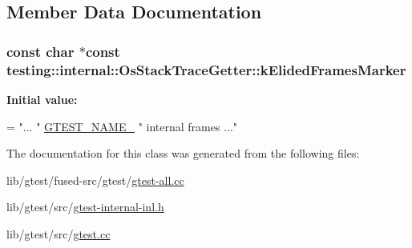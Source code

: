 \subsection{Member Data Documentation}
\hypertarget{classtesting_1_1internal_1_1_os_stack_trace_getter_aa736c26a4ba2b59a7572e7f44bfe269e}{
\subsubsection[{k\-Elided\-Frames\-Marker}]{\setlength{\rightskip}{0pt plus 5cm}const char $\ast$const testing\-::internal\-::\-Os\-Stack\-Trace\-Getter\-::k\-Elided\-Frames\-Marker\hspace{0.3cm}{\ttfamily [static]}}}\label{classtesting_1_1internal_1_1_os_stack_trace_getter_aa736c26a4ba2b59a7572e7f44bfe269e}
{\bfseries Initial value\-:}
\begin{DoxyCode}
=
    \textcolor{stringliteral}{"... "} \hyperlink{fused-src_2gtest_2gtest_8h_a13d98c217176bd8722c395b9225fc19d}{GTEST\_NAME\_} \textcolor{stringliteral}{" internal frames ..."}
\end{DoxyCode}


The documentation for this class was generated from the following files\-:\begin{DoxyCompactItemize}
\item 
lib/gtest/fused-\/src/gtest/\hyperlink{fused-src_2gtest_2gtest-all_8cc}{gtest-\/all.\-cc}\item 
lib/gtest/src/\hyperlink{gtest-internal-inl_8h}{gtest-\/internal-\/inl.\-h}\item 
lib/gtest/src/\hyperlink{gtest_8cc}{gtest.\-cc}\end{DoxyCompactItemize}
